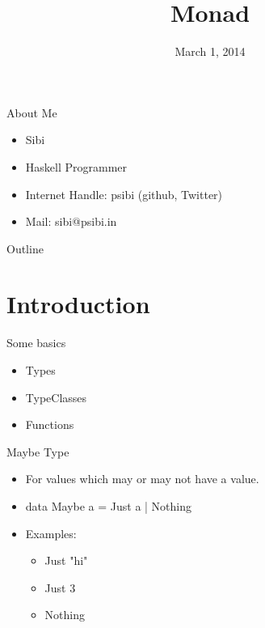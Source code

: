 \documentclass{beamer}
\title[Just Another Abstraction] %
{Monad}
\author[Sibi] %
{}
\institute[CHENSE Meetup] %
{ 
}
\date[] %
{March 1, 2014}
\begin{document}
\begin{frame}
  \titlepage
\end{frame}

\begin{frame}{About Me}
\begin{itemize}
\item
Sibi
\item
Haskell Programmer
\item
Internet Handle: psibi (github, Twitter)
\item
  Mail: sibi@psibi.in
\end{itemize}
\end{frame}

\begin{frame}{Outline}
  \tableofcontents
\end{frame}




\section{Introduction}

\begin{frame}{Some basics}
\begin{itemize}

\item
Types
\item
TypeClasses
\item
Functions
\end{itemize}
\end{frame}

\begin{frame}{Maybe Type}
  \begin{itemize}
  \item For values which may or may not have a value.
  \item data Maybe a = Just a | Nothing
  \item Examples:
    \begin{itemize}
    \item Just "hi"
    \item Just 3
    \item Nothing
    \end{itemize}
  \end{itemize}

\end{frame}
\end{document}
